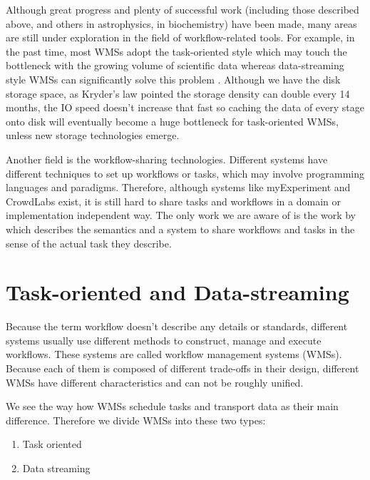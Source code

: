 Although great progress and plenty of successful work (including those described above, and others \eg \cite{berriman2007generating} \cite{berriman2010application} in astrophysics, \cite{aiche2015workflows} in biochemistry) have been made, many areas are still under exploration in the field of workflow-related tools. For example, in the past time, most WMSs adopt the task-oriented style which may touch the bottleneck with the growing volume of scientific data whereas data-streaming style WMSs can significantly solve this problem \cite{doi:10.1177/1094342016649766}. Although we have the disk storage space, as Kryder’s law \citep{Kryders_law} pointed the storage density can double every 14 months, the IO speed doesn't increase that fast so caching the data of every stage onto disk will eventually become a huge bottleneck for task-oriented WMSs, unless new storage technologies emerge.

Another field is the workflow-sharing technologies. Different systems have different techniques to set up workflows or tasks, which may involve programming languages and paradigms. Therefore, although systems like myExperiment \cite{de2008design} and CrowdLabs \cite{Mates2011} exist, it is still hard to share tasks and workflows in a domain or implementation independent way. The only work we are aware of is the work by \citeauthor{GARIJO2017271} \cite{GARIJO2017271} which describes the semantics and a system to share workflows and tasks in the sense of the actual task they describe. 

\section{Task-oriented and Data-streaming}
Because the term workflow doesn't describe any details or standards, different systems usually use different methods to construct, manage and execute workflows. These systems are called workflow management systems (WMSs). Because each of them is composed of different trade-offs in their design, different WMSs have different characteristics and can not be roughly unified.

We see the way how WMSs schedule tasks and transport data as their main difference. Therefore we divide WMSs into these two types:
\begin{enumerate}
	\item Task oriented
	\item Data streaming
\end{enumerate}

